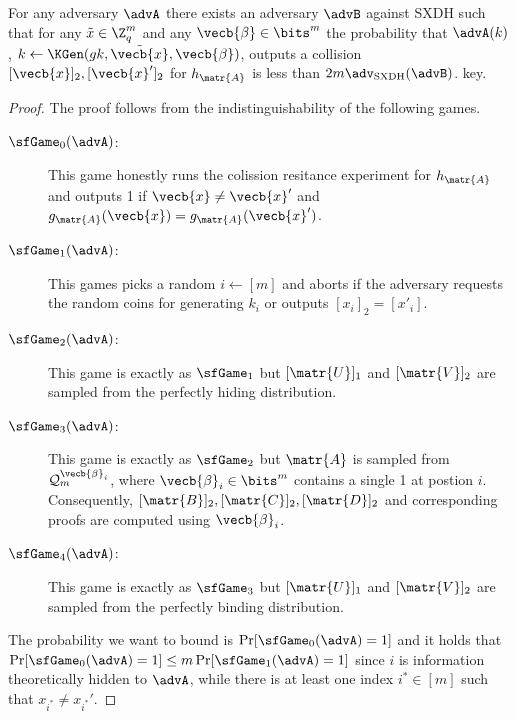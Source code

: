 \begin{lemma}
For any adversary $\advA$ there exists an adversary $\advB$ against SXDH such that for any $\tilde{x}\in\Z_q^m$ and any $\vecb{\beta}\in\bits^m$  the probability that $\advA(k)$, $k\gets\KGen(gk,\tilde{\vecb{x}},\vecb{\beta})$, outputs a collision $[\vecb{x}]_2,[\vecb{x}']_2$ for $h_\matr{A}$  is less than $2m \adv_{\mathrm{SXDH}}(\advB)$. key.
\end{lemma}
\begin{proof}
The proof follows from the indistinguishability of the following games.
\begin{description}
\item[$\sfGame_0(\advA)$:] This game honestly runs the colission resitance experiment for $h_{\matr{A}}$ and outputs 1 if $\vecb{x}\neq\vecb{x}'$ and $g_\matr{A}(\vecb{x})=g_{\matr{A}}(\vecb{x}')$.
\item[$\sfGame_1(\advA)$:] This games picks a random $i\gets[m]$ and aborts if the adversary requests the random coins for generating $k_i$ or outputs $[x_i]_2=[x'_i]$.
\item[$\sfGame_2(\advA)$:] This game is exactly as $\sfGame_1$ but $[\matr{U}]_1$ and $[\matr{V}]_2$ are sampled from the perfectly hiding distribution.
\item[$\sfGame_3(\advA)$:] This game is exactly as $\sfGame_2$ but $\matr{A}$ is sampled from $\mathcal{Q}_m^{\vecb{\beta}_i}$, where $\vecb{\beta}_i\in\bits^m$ contains a single 1 at postion $i$. Consequently, $[\matr{B}]_2,[\matr{C}]_2,[\matr{D}]_2$ and corresponding proofs are computed using $\vecb{\beta}_i$.
\item[$\sfGame_4(\advA)$:] This game is exactly as $\sfGame_3$ but $[\matr{U}]_1$ and $[\matr{V}]_2$ are sampled from the perfectly binding distribution.
\end{description}
The probability we want to bound is $\Pr[\sfGame_0(\advA)=1]$ and it holds that $\Pr[\sfGame_0(\advA)=1]\leq m\Pr[\sfGame_1(\advA)=1]$ since $i$ is information theoretically hidden to $\advA$, while there is at least one index $i^*\in[m]$ such that $x_{i^*} \neq x_{i^*}'$.


\end{proof}
